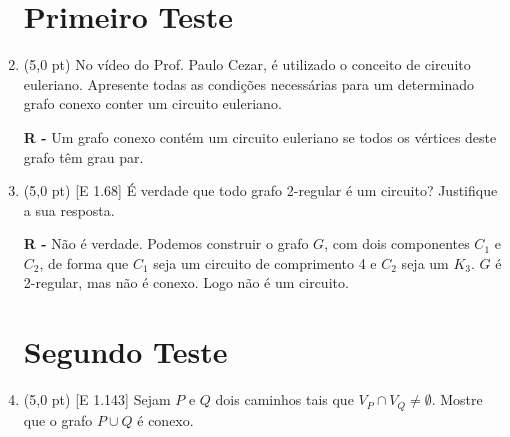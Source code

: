 \documentclass[12pt,a4paper,oneside]{article}
\begin{document}
\begin{enumerate}

	\section*{Primeiro Teste}

	\item (5,0 pt) No vídeo do Prof. Paulo Cezar, é utilizado o conceito de circuito euleriano. Apresente todas as condições necessárias para um determinado grafo conexo conter um circuito euleriano.

	\vspace{0.3cm}	
	
	{\color{blue} {\bf R -} Um grafo conexo contém um circuito euleriano se todos os vértices deste grafo têm grau par. }
	
	\vspace{0.3cm}
	
	\item (5,0 pt) [E 1.68] É verdade que todo grafo 2-regular é um circuito? Justifique a sua resposta.
	
	\vspace{0.3cm}	
	
	{\color{blue} {\bf R -} Não é verdade. Podemos construir o grafo $G$, com dois componentes $C_1$ e $C_2$, de forma que $C_1$ seja um circuito de comprimento 4 e $C_2$ seja um $K_3$. $G$ é 2-regular, mas não é conexo. Logo não é um circuito. }
	
	\newpage
	
	\section*{Segundo Teste}

	\item (5,0 pt) [E 1.143] Sejam $P$ e $Q$ dois caminhos tais que $V_P \cap V_Q \not= \emptyset$. Mostre que o
grafo $P \cup Q$ é conexo.

	\vspace{0.3cm}	
	

\end{enumerate}
\end{document}
